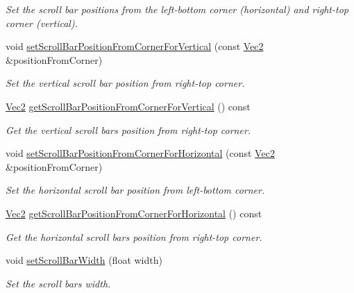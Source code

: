 \begin{DoxyCompactItemize}
\begin{DoxyCompactList}\small\item\em Set the scroll bar positions from the left-\/bottom corner (horizontal) and right-\/top corner (vertical). \end{DoxyCompactList}\item 
void \hyperlink{classui_1_1ScrollView_ab7cf5ce2326062e96fa6dfaa947399fe}{set\+Scroll\+Bar\+Position\+From\+Corner\+For\+Vertical} (const \hyperlink{classVec2}{Vec2} \&position\+From\+Corner)
\begin{DoxyCompactList}\small\item\em Set the vertical scroll bar position from right-\/top corner. \end{DoxyCompactList}\item 
\hyperlink{classVec2}{Vec2} \hyperlink{classui_1_1ScrollView_a906ca15a2925ad9bd9221e48a927cee8}{get\+Scroll\+Bar\+Position\+From\+Corner\+For\+Vertical} () const
\begin{DoxyCompactList}\small\item\em Get the vertical scroll bar\textquotesingle{}s position from right-\/top corner. \end{DoxyCompactList}\item 
void \hyperlink{classui_1_1ScrollView_a8397f63974607826080a8b89ff640915}{set\+Scroll\+Bar\+Position\+From\+Corner\+For\+Horizontal} (const \hyperlink{classVec2}{Vec2} \&position\+From\+Corner)
\begin{DoxyCompactList}\small\item\em Set the horizontal scroll bar position from left-\/bottom corner. \end{DoxyCompactList}\item 
\hyperlink{classVec2}{Vec2} \hyperlink{classui_1_1ScrollView_a0c4831dff761f1d878f46f4b781d1e54}{get\+Scroll\+Bar\+Position\+From\+Corner\+For\+Horizontal} () const
\begin{DoxyCompactList}\small\item\em Get the horizontal scroll bar\textquotesingle{}s position from right-\/top corner. \end{DoxyCompactList}\item 
void \hyperlink{classui_1_1ScrollView_a0dbec02f20b0b8ef401c6ddd14e4e1de}{set\+Scroll\+Bar\+Width} (float width)
\begin{DoxyCompactList}\small\item\em Set the scroll bar\textquotesingle{}s width. \end{DoxyCompactList}\item 

\end{DoxyCompactItemize}
